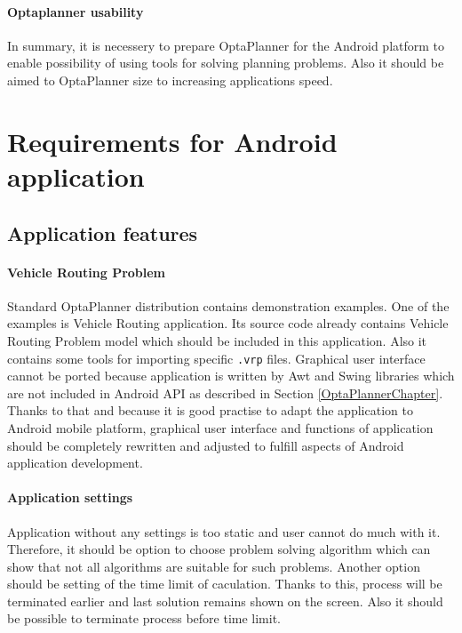 \paragraph{Optaplanner usability}
In summary, it is necessery to prepare OptaPlanner for the Android platform to enable possibility of using tools for
solving planning problems. Also it should be aimed to OptaPlanner size to increasing applications speed.

\section{Requirements for Android application}

\subsection{Application features}

\paragraph{Vehicle Routing Problem}
Standard OptaPlanner distribution \cite{OptaPlannerDistribution} contains demonstration examples. One of the examples is
Vehicle Routing application. Its source code already contains Vehicle Routing Problem model which should be included in
this application. Also it contains some tools for importing specific \texttt{.vrp} files. Graphical user interface
cannot be ported because application is written by Awt and Swing libraries which are not included in Android API as
described in Section \ref{OptaPlannerChapter}. Thanks to that and because it is good practise to adapt the application
to Android mobile platform, graphical user interface and functions of application should be completely rewritten and
adjusted to fulfill aspects of Android application development.

\paragraph{Application settings}
Application without any settings is too static and user cannot do much with it. Therefore, it should be option to choose
problem solving algorithm  which can show that not all algorithms are suitable for such problems. Another option should
be setting of the time limit of caculation. Thanks to this, process will be terminated earlier and last solution remains
shown on the screen. Also it should be possible to terminate process before time limit.

